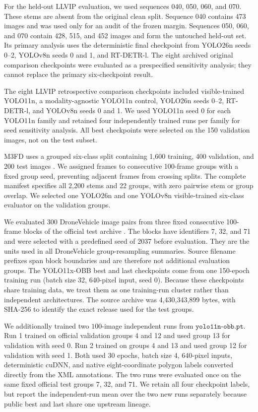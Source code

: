 \documentclass[preprint,11pt]{elsarticle}
\begin{document}
For the held-out LLVIP evaluation, we used sequences 040, 050, 060, and 070.
These stems are absent from the original clean split. Sequence 040 contains
473 images and was used only for an audit of the frozen margin. Sequences 050,
060, and 070 contain 428, 515, and 452 images and form the untouched
held-out set. Its primary analysis uses the deterministic final checkpoint
from YOLO26n seeds 0--2, YOLOv8n seeds 0 and 1, and RT-DETR-l. The eight
archived original comparison checkpoints were evaluated as a prespecified
sensitivity analysis; they cannot replace the primary six-checkpoint result.

The eight LLVIP retrospective comparison checkpoints included visible-trained YOLO11n, a
modality-agnostic YOLO11n control, YOLO26n seeds 0--2, RT-DETR-l, and YOLOv8n
seeds 0 and 1. We used YOLO11n seed 0 for each YOLO11n family and retained four
independently trained runs per family for seed sensitivity analysis. All best
checkpoints were selected on the 150 validation images, not on the test subset.

M3FD uses a grouped six-class split containing 1,600 training, 400 validation,
and 200 test images \cite{liu2022}. We assigned frames to consecutive 100-frame
groups with a fixed group seed, preventing adjacent frames from crossing splits.
The complete manifest specifies all 2,200 stems and 22 groups, with zero
pairwise stem or group overlap. We selected one YOLO26n and one YOLOv8n
visible-trained six-class evaluator on the validation groups.

We evaluated 300 DroneVehicle image pairs from three fixed consecutive 100-frame
blocks of the official test archive \cite{sun2022}. The blocks have identifiers
7, 32, and 71 and were selected with a predefined seed of 2037 before
evaluation. They are the units used in all DroneVehicle group-resampling
summaries. Source filename prefixes span block boundaries and are therefore not
additional evaluation groups. The YOLO11x-OBB best and last checkpoints come
from one 150-epoch training run (batch size 32, 640-pixel input, seed 0).
Because these checkpoints share training data, we treat them as one
training-run cluster rather than independent architectures. The source archive
was 4,430,343,899 bytes, with SHA-256
\texttt{}
to identify the exact release used for the test groups.

We additionally trained two \(100\)-image independent runs from
\(\texttt{yolo11n-obb.pt}\). Run 1 trained on official validation groups 4 and
12 and used group 13 for validation with seed 0. Run 2 trained on groups 4 and
13 and used group 12 for validation with seed 1. Both used 30 epochs, batch
size 4, 640-pixel inputs, deterministic cuDNN, and native eight-coordinate
polygon labels converted directly from the XML annotations. The two runs were
evaluated once on the same fixed official test groups 7, 32, and 71. We retain
all four checkpoint labels, but report the independent-run mean over the two
new runs separately because public best and last share one upstream lineage.
\end{document}
